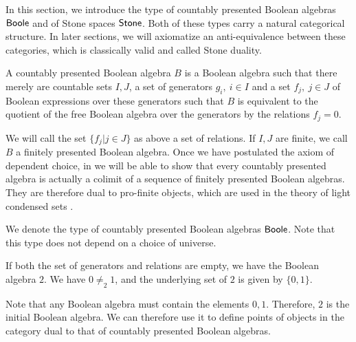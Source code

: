 In this section, we introduce the type of countably presented Boolean algebras $\mathsf{Boole}$ and of Stone spaces $\mathsf{Stone}$. 
Both of these types carry a natural categorical structure. 
In later sections, we will axiomatize an anti-equivalence between these categories, 
which is classically valid and called Stone duality. 


\begin{definition}
  A countably presented Boolean algebra $B$ is a Boolean algebra such that there merely are 
  countable sets $I,J$, 
  a set of generators $g_i,~{i\in I}$ and a set $f_j,~{j\in J}$ of Boolean expressions over these generators 
  such that $B$ is equivalent to the quotient of the free Boolean algebra over the generators by the relations
  $f_j=0$. 
\end{definition} 
We will call the set $\{f_j|j\in J\}$ as above a set of relations. 
If $I,J$ are finite, we call $B$ a finitely presented Boolean algebra. 
Once we have postulated the axiom of dependent choice, 
in 
we will be able to show that every countably presented algebra 
is actually a colimit of a sequence of finitely presented Boolean algebras.
They are therefore dual to pro-finite objects, which are used 
in the theory of light condensed sets \cite{Scholze,Dagur,TODO}.

\begin{remark}
  We denote the type of countably presented Boolean algebras $\mathsf{Boole}$. 
  Note that this type does not depend on a choice of universe. 
\end{remark}

\begin{example}
  If both the set of generators and relations are empty, we have the Boolean algebra $2$.
  We have $0\neq_2 1$, and the underlying set of $2$ is given by $\{0,1\}$.
\end{example}
Note that any Boolean algebra must contain the elements $0,1$. 
Therefore, $2$ is the initial Boolean algebra. 
We can therefore use it to define points of objects in the category dual to that of countably presented Boolean algebras. 

